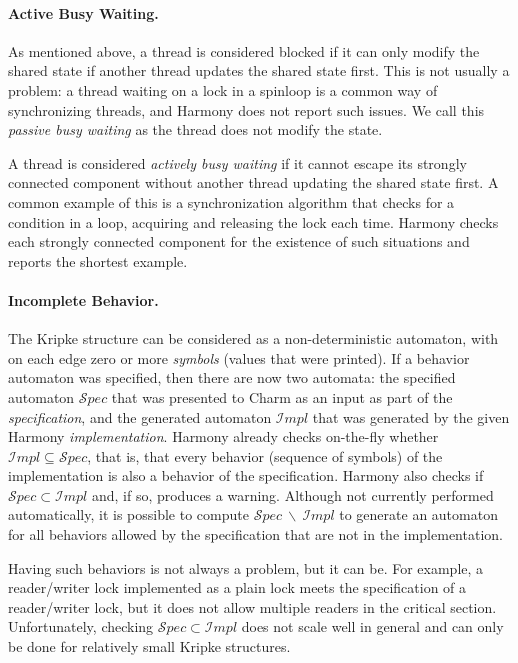 \documentclass[twocolumn]{article}
\begin{document}
\paragraph{Active Busy Waiting.}

As mentioned above, a thread is considered blocked if it can only
modify the shared state if another thread updates the shared state
first.  This is not usually a problem: a thread waiting on a lock
in a spinloop is a common way of synchronizing threads, and Harmony
does not report such issues.  We call this \emph{passive busy
waiting} as the thread does not modify the state.

A thread is considered \emph{actively busy waiting} if it cannot
escape its strongly connected component without another thread
updating the shared state first.  A common example of this is a
synchronization algorithm that checks for a condition in a loop,
acquiring and releasing the lock each time.  Harmony checks each
strongly connected component for the existence of such situations
and reports the shortest example.

\paragraph{Incomplete Behavior.}

The Kripke structure can be considered as a non-deterministic
automaton, with on each edge zero or more \emph{symbols} (values
that were printed).  If a behavior automaton was specified,
then there are now two automata: the specified automaton
${\mathcal Spec}$ that was presented to Charm as an input as
part of the \emph{specification}, and the generated automaton
${\mathcal Impl}$ that was generated by the given Harmony
\emph{implementation}.  Harmony already checks on-the-fly whether
${\mathcal Impl} \subseteq {\mathcal Spec}$, that is, that every
behavior (sequence of symbols) of the implementation is also a
behavior of the specification.  Harmony also checks if
${\mathcal Spec} \subset {\mathcal Impl}$ and, if so,
produces a warning.
Although not currently performed automatically, it is possible to compute
${\mathcal Spec}~\backslash~{\mathcal Impl}$
to generate an automaton for all behaviors allowed by the
specification that are not in the implementation.

Having such behaviors is not always a problem, but it can be.  For
example, a reader/writer lock implemented as a plain lock meets the
specification of a reader/writer lock, but it does not allow multiple
readers in the critical section.  Unfortunately, checking ${\mathcal
Spec} \subset {\mathcal Impl}$ does not scale well in general and can
only be done for relatively small Kripke structures.
\end{document}
